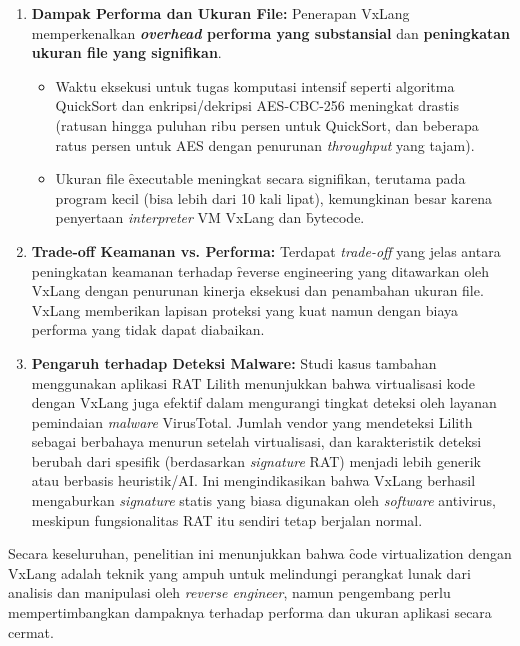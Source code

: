 \begin{enumerate}
    \item \textbf{Dampak Performa dan Ukuran File:} Penerapan VxLang memperkenalkan \textbf{\textit{overhead} performa yang substansial} dan \textbf{peningkatan ukuran file yang signifikan}.
        \begin{itemize}
            \item Waktu eksekusi untuk tugas komputasi intensif seperti algoritma QuickSort dan enkripsi/dekripsi AES-CBC-256 meningkat drastis (ratusan hingga puluhan ribu persen untuk QuickSort, dan beberapa ratus persen untuk AES dengan penurunan \textit{throughput} yang tajam).
            \item Ukuran file \f{executable} meningkat secara signifikan, terutama pada program kecil (bisa lebih dari 10 kali lipat), kemungkinan besar karena penyertaan \textit{interpreter} VM VxLang dan \f{bytecode}.
        \end{itemize}

    \item \textbf{Trade-off Keamanan vs. Performa:} Terdapat \textit{trade-off} yang jelas antara peningkatan keamanan terhadap \f{reverse engineering} yang ditawarkan oleh VxLang dengan penurunan kinerja eksekusi dan penambahan ukuran file. VxLang memberikan lapisan proteksi yang kuat namun dengan biaya performa yang tidak dapat diabaikan.

    \item \textbf{Pengaruh terhadap Deteksi Malware:} Studi kasus tambahan menggunakan aplikasi RAT Lilith menunjukkan bahwa virtualisasi kode dengan VxLang juga efektif dalam mengurangi tingkat deteksi oleh layanan pemindaian \textit{malware} VirusTotal. Jumlah vendor yang mendeteksi Lilith sebagai berbahaya menurun setelah virtualisasi, dan karakteristik deteksi berubah dari spesifik (berdasarkan \textit{signature} RAT) menjadi lebih generik atau berbasis heuristik/AI. Ini mengindikasikan bahwa VxLang berhasil mengaburkan \textit{signature} statis yang biasa digunakan oleh \textit{software} antivirus, meskipun fungsionalitas RAT itu sendiri tetap berjalan normal.
\end{enumerate}

Secara keseluruhan, penelitian ini menunjukkan bahwa \f{code virtualization} dengan VxLang adalah teknik yang ampuh untuk melindungi perangkat lunak dari analisis dan manipulasi oleh \textit{reverse engineer}, namun pengembang perlu mempertimbangkan dampaknya terhadap performa dan ukuran aplikasi secara cermat.


